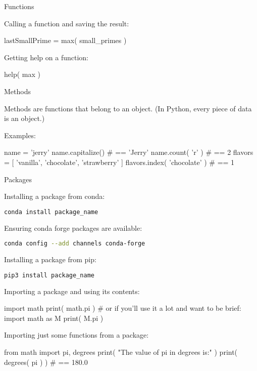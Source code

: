 \documentclass[a4paper,landscape,columns=3]{cheatsheet}
\def\sect#1{\begin{tcolorbox}[colback=blue!5!white,colframe=blue!75!black,size=title,leftrule=2mm]
    \large #1
\end{tcolorbox}}
\begin{document}
\sect{Functions}

Calling a function and saving the result:
\begin{python}
lastSmallPrime = max( small_primes )
\end{python}

Getting help on a function:
\begin{python}
help( max )
\end{python}

\sect{Methods}

Methods are functions that belong to an object.  (In Python, every piece of data is an object.)

Examples:
\begin{python}
name = 'jerry'
name.capitalize()             # == 'Jerry'
name.count( 'r' )             # == 2
flavors = [ 'vanilla', 'chocolate', 'strawberry' ]
flavors.index( 'chocolate' )  # == 1
\end{python}

\sect{Packages}

Installing a package from conda:
\begin{tcolorbox}[size=tight]
\begin{lstlisting}[language=bash]
 conda install package_name
\end{lstlisting}
\end{tcolorbox}

Ensuring conda forge packages are available:
\begin{tcolorbox}[size=tight]
\begin{lstlisting}[language=bash]
 conda config --add channels conda-forge
\end{lstlisting}
\end{tcolorbox}

Installing a package from pip:
\begin{tcolorbox}[size=tight]
\begin{lstlisting}[language=bash]
 pip3 install package_name
\end{lstlisting}
\end{tcolorbox}

Importing a package and using its contents:
\begin{python}
import math
print( math.pi )
# or if you'll use it a lot and want to be brief:
import math as M
print( M.pi )
\end{python}

Importing just some functions from a package:
\begin{python}
from math import pi, degrees
print( "The value of pi in degrees is:" )
print( degrees( pi ) )        # == 180.0
\end{python}
\end{document}
